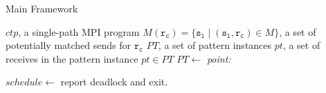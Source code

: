 \begin{algorithm}
\caption{Main Framework}\label{algo:main}
\begin{algorithmic}[1]
\Require $\mathit{ctp}$, a single-path MPI program
\Require $\mathit{M}(\mathtt{r_c}) = \{\mathtt{s_l}\mid(\mathtt{s_l},\mathtt{r_c})\in\mathit{M}\}$, a set of potentially matched sends for $\mathtt{r_c}$
\State  $\mathit{PT}$, a set of pattern instances
\State  $\mathit{pt}$, a set of receives in the pattern instance $\mathit{pt}\in\mathit{PT}$
\State  $\mathit{PT} \gets$ 
\State \emph{point:}

\State $\mathit{schedule} \gets$  
\State report deadlock and exit.
\EndIf
\EndIf

\EndFor
\end{algorithmic}
\end{algorithm}



